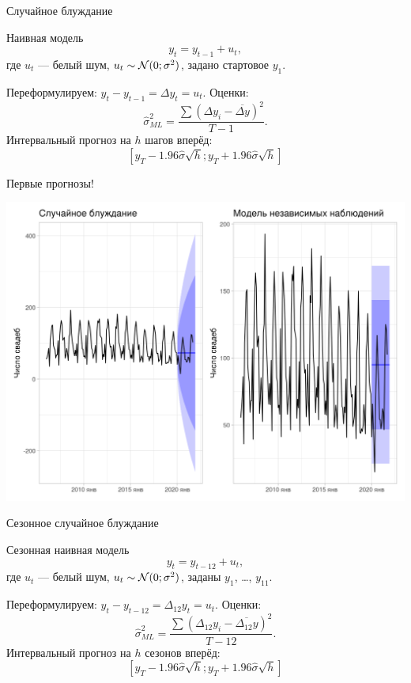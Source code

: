 \begin{frame}{Случайное блуждание}

  \begin{block}{Наивная модель}
  \[
  y_t = y_{t-1} + u_t,  
  \]
  где $u_t$ — белый шум, $u_t \sim \mathcal{N}(0;\sigma^2)$, задано стартовое $y_1$.
  \end{block}
  \pause
  Переформулируем: $y_t - y_{t-1} = \Delta y_t = u_t$.
  \pause
  \alert{Оценки:}
  \[
  \hat\sigma^2_{ML} = \frac{\sum(\Delta y_i - \overline {\Delta y})^2}{T - 1}.  
  \]
  \pause
  \alert{Интервальный прогноз} на $h$ шагов вперёд:
  \[
  [y_T - 1.96 \hat \sigma \sqrt{h}; y_T + 1.96 \hat \sigma  \sqrt{h}]  
  \]
\end{frame}

\begin{frame}{Первые прогнозы!}

  \includegraphics[width=\textwidth]{pictures/om_ts_01-157.png}

\end{frame}


\begin{frame}{Сезонное случайное блуждание}

  \begin{block}{Сезонная наивная модель}
  \[
  y_t = y_{t-12} + u_t,  
  \]
  где $u_t$ — белый шум, $u_t \sim \mathcal{N}(0;\sigma^2)$, заданы $y_1$, \ldots, $y_{11}$.
  \end{block}
  \pause
  Переформулируем: $y_t - y_{t-12} = \Delta_{12} y_t = u_t$.
  \pause
  \alert{Оценки:}
  \[
  \hat\sigma^2_{ML} = \frac{\sum(\Delta_{12} y_i - \overline {\Delta_{12} y})^2}{T - 12}.  
  \]
  \pause
  \alert{Интервальный прогноз} на $h$ \alert{сезонов} вперёд:
  \[
  [y_{T} - 1.96 \hat \sigma \sqrt{h}; y_{T} + 1.96 \hat \sigma  \sqrt{h}]  
  \]
\end{frame}

